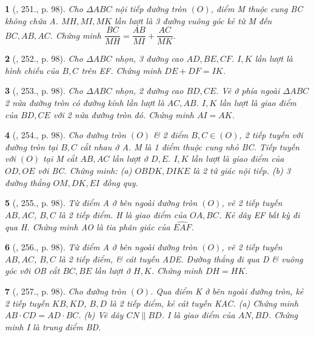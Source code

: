 \documentclass{article}
\newtheorem{baitoan}{}
\begin{document}
\begin{baitoan}[\cite{Binh_Toan_9_tap_2}, 251., p. 98]
	Cho $\Delta ABC$ nội tiếp đường tròn $(O)$, điểm M thuộc cung BC không chứa A. $MH,MI,MK$ lần lượt là 3 đường vuông góc kẻ từ M đến $BC,AB,AC$. Chứng minh $\dfrac{BC}{MH} = \dfrac{AB}{MI} + \dfrac{AC}{MK}$.
\end{baitoan}

\begin{baitoan}[\cite{Binh_Toan_9_tap_2}, 252., p. 98]
	Cho $\Delta ABC$ nhọn, 3 đường cao $AD,BE,CF$. $I,K$ lần lượt là hình chiếu của $B,C$ trên EF. Chứng minh $DE + DF = IK$.
\end{baitoan}

\begin{baitoan}[\cite{Binh_Toan_9_tap_2}, 253., p. 98]
	Cho $\Delta ABC$ nhọn, 2 đường cao $BD,CE$. Vẽ ở phía ngoài $\Delta ABC$ 2 nửa đường tròn có đường kính lần lượt là $AC,AB$. $I,K$ lần lượt là giao điểm của $BD,CE$ với 2 nửa đường tròn đó. Chứng minh $AI = AK$.
\end{baitoan}

\begin{baitoan}[\cite{Binh_Toan_9_tap_2}, 254., p. 98]
	Cho đường tròn $(O)$ \& 2 điểm $B,C\in(O)$, 2 tiếp tuyến với đường tròn tại $B,C$ cắt nhau ở A. M là 1 điểm thuộc cung nhỏ BC. Tiếp tuyến với $(O)$ tại M cắt $AB,AC$ lần lượt ở $D,E$. $I,K$ lần lượt là giao điểm của $OD,OE$ với BC. Chứng minh: (a) $OBDK,DIKE$ là 2 tứ giác nội tiếp. (b) 3 đường thẳng $OM,DK,EI$ đồng quy.
\end{baitoan}

\begin{baitoan}[\cite{Binh_Toan_9_tap_2}, 255., p. 98]
	Từ điểm A ở bên ngoài đường tròn $(O)$, vẽ 2 tiếp tuyến $AB,AC$, $B,C$ là 2 tiếp điểm. H là giao điểm của $OA,BC$. Kẻ dây EF bất kỳ đi qua H. Chứng minh AO là tia phân giác của $\widehat{EAF}$.
\end{baitoan}

\begin{baitoan}[\cite{Binh_Toan_9_tap_2}, 256., p. 98]
	Từ điểm A ở bên ngoài đường tròn $(O)$, vẽ 2 tiếp tuyến $AB,AC$, $B,C$ là 2 tiếp điểm, \& cát tuyến ADE. Đường thẳng đi qua D \& vuông góc với OB cắt $BC,BE$ lần lượt ở $H,K$. Chứng minh $DH = HK$.
\end{baitoan}

\begin{baitoan}[\cite{Binh_Toan_9_tap_2}, 257., p. 98]
	Cho đường tròn $(O)$. Qua điểm K ở bên ngoài đường tròn, kẻ 2 tiếp tuyến $KB,KD$, $B,D$ là 2 tiếp điểm, kẻ cát tuyến KAC. (a) Chứng minh $AB\cdot CD = AD\cdot BC$. (b) Vẽ dây $CN\parallel BD$. I là giao điểm của $AN,BD$. Chứng minh I là trung điểm BD.
\end{baitoan}
\end{document}
